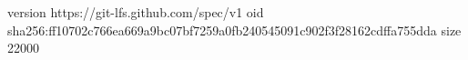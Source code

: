 version https://git-lfs.github.com/spec/v1
oid sha256:ff10702c766ea669a9bc07bf7259a0fb240545091c902f3f28162cdffa755dda
size 22000
